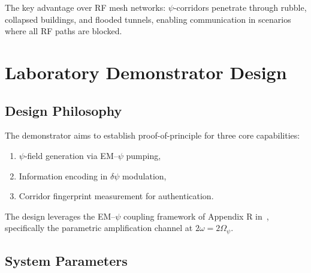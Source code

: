 \documentclass[twocolumn,superscriptaddress,prd,nofootinbib]{revtex4-2}
\begin{document}
The key advantage over RF mesh networks: $\psi$-corridors penetrate
through rubble, collapsed buildings, and flooded tunnels, enabling
communication in scenarios where all RF paths are blocked.

\section{Laboratory Demonstrator Design}\label{sec:demonstrator}

\subsection{Design Philosophy}

The demonstrator aims to establish proof-of-principle for three core
capabilities:
\begin{enumerate}
\item $\psi$-field generation via EM--$\psi$ pumping,
\item Information encoding in $\delta\psi$ modulation,
\item Corridor fingerprint measurement for authentication.
\end{enumerate}

The design leverages the EM--$\psi$ coupling framework of Appendix R
in~\cite{Alcock2025DFD}, specifically the parametric amplification
channel at $2\omega = 2\Omega_\psi$.

\subsection{System Parameters}
\end{document}
